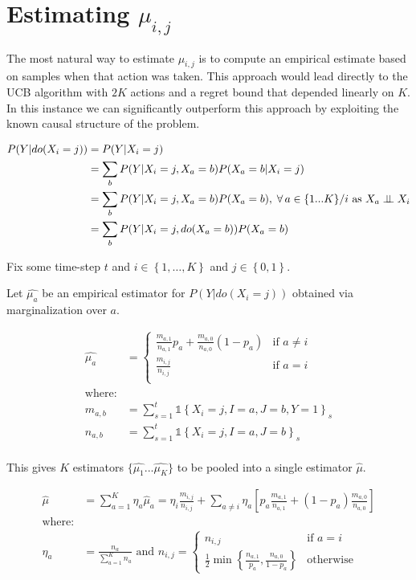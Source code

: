\documentclass{article}
\newcommand{\set}[1]{\left\{#1\right\}}
\newcommand{\ind}[1]{\mathds{1}\!\!\set{#1}}
\newcommand{\eq}[1]{\begin{align*}#1\end{align*}}
\theoremstyle{plain}
\theoremstyle{definition}
\begin{document}
\section{Estimating $\mu_{i,j}$}
The most natural way to estimate $\mu_{i,j}$ is to compute an empirical estimate based on samples when that action was taken. This approach would
lead directly to the UCB algorithm with $2K$ actions and a regret bound that depended linearly on $K$. In this instance we can significantly
outperform this approach by exploiting the known causal structure of the problem.

\eq {
P(Y|do(X_i=j)) &= P(Y|X_i = j)\\
 &= \sum_{b}P(Y|X_i = j,X_a = b)P(X_a = b|X_i = j) \\
 &= \sum_{b}P(Y|X_i = j,X_a = b)P(X_a = b), \; \forall \, a \in \{1...K\}/i \text{ as } X_a \ci X_i\\
 &= \sum_{b}P(Y|X_i = j,do(X_a = b))P(X_a = b) 
}

Fix some time-step $t$ and $i \in \set{1,\ldots,K}$ and $j \in \set{0,1}$. 

Let $\hat{\mu_a}$ be an empirical estimator for $P(Y|do(X_i=j))$ obtained via marginalization over $a$.

\eq {
\hat{\mu_a} &=
\begin{cases}
\frac{m_{a,1}}{n_{a,1}}p_a+\frac{m_{a,0}}{n_{a,0}}(1-p_a) & \text{if } a \neq{i} \\
\frac{m_{i,j}}{n_{i,j}} & \text{if } a=i \\
\end{cases}\\
\text{where:}\\
m_{a,b}    &= \sum_{s=1}^t \ind{X_i = j, I = a,J = b, Y = 1}_s \\
n_{a,b}    &= \sum_{s=1}^t \ind{X_i = j, I = a,J = b}_s \\
}



This gives $K$ estimators $\{\hat{\mu_1}...\hat{\mu_K}\}$ to be pooled into a single estimator $\hat{\mu}$.

\eq {
\hat{\mu} &= \sum^{K}_{a=1}\eta_a\hat{\mu}_a=\eta_i \frac{m_{i,j}}{n_{i,j}}+ \sum_{a \neq i} \eta_a \left[p_a \frac{m_{a,1}}{n_{a,1}} + (1 - p_a) \frac{m_{a,0}}{n_{a,0}}\right]\\
\text{where:}\\
\eta_a     &= \frac{n_a}{\sum_{a=1}^K n_a} \text{ and } n_{i,j}=\begin{cases} 
n_{i,j} & \text{if } a = i \\
\frac{1}{2}\min\set{\frac{n_{a,1}}{p_a}, \frac{n_{a,0}}{1-p_a}}  & \text{otherwise}
\end{cases}
}
\end{document}
